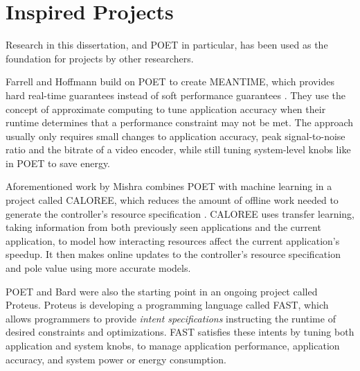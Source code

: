 \section{Inspired Projects}
\label{sec:related-inspired}

Research in this dissertation, and POET in particular, has been used as the foundation for projects by other researchers.

Farrell and Hoffmann build on POET to create MEANTIME, which provides hard real-time guarantees instead of soft performance guarantees \cite{meantime}.
They use the concept of approximate computing to tune application accuracy when their runtime determines that a performance constraint may not be met.
The approach usually only requires small changes to application accuracy, \eg peak signal-to-noise ratio and the bitrate of a video encoder, while still tuning system-level knobs like in POET to save energy.

Aforementioned work by Mishra \etal combines POET with machine learning in a project called CALOREE, which reduces the amount of offline work needed to generate the controller's resource specification \cite{CALOREE}.
CALOREE uses transfer learning, taking information from both previously seen applications and the current application, to model how interacting resources affect the current application's speedup.
It then makes online updates to the controller's resource specification and pole value using more accurate models.

POET and Bard were also the starting point in an ongoing project called Proteus.
Proteus is developing a programming language called FAST, which allows programmers to provide \emph{intent specifications} instructing the runtime of desired constraints and optimizations.
FAST satisfies these intents by tuning both application and system knobs, \eg to manage application performance, application accuracy, and system power or energy consumption.
